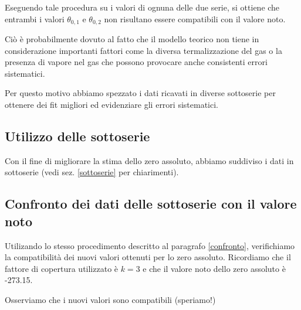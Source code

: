 Eseguendo tale procedura su i valori di ognuna delle due serie, si ottiene che entrambi i valori $\theta_{0,1}$ e $\theta_{0,2}$ non risultano essere compatibili con il valore noto.

Ciò è probabilmente dovuto al fatto che il modello teorico non tiene in considerazione importanti fattori come la diversa termalizzazione del gas o la presenza di vapore nel gas che possono provocare anche consistenti errori sistematici.
\bigskip

Per questo motivo abbiamo spezzato i dati ricavati in diverse sottoserie per ottenere dei fit migliori ed evidenziare gli errori sistematici.

\subsection{Utilizzo delle sottoserie}

Con il fine di migliorare la stima dello zero assoluto, abbiamo suddiviso i dati in sottoserie (vedi sez. \ref{sottoserie} per chiarimenti). 

\subsection{Confronto dei dati delle sottoserie con il valore noto}

Utilizando lo stesso procedimento descritto al paragrafo \ref{confronto}, verifichiamo la compatibilità dei nuovi valori ottenuti per lo zero assoluto.
Ricordiamo che il fattore di copertura utilizzato è $k=3$ e che il valore noto dello zero assoluto è -273.15.

Osserviamo che i nuovi valori sono compatibili (speriamo!)
